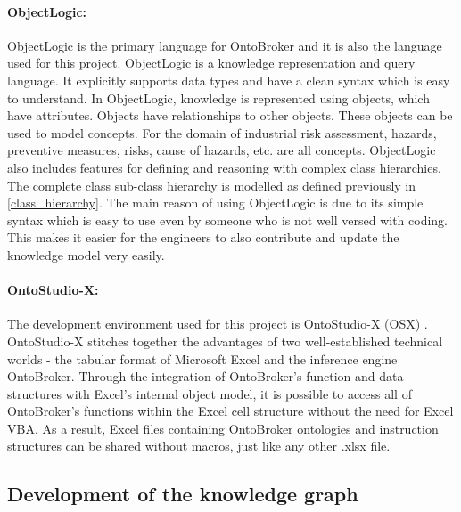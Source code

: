 \paragraph{ObjectLogic: } ObjectLogic is the primary language for OntoBroker and it is also the language used for this project. ObjectLogic \cite{obl} is a knowledge representation and query language. It explicitly supports data types and have a clean syntax which is easy to understand. In ObjectLogic, knowledge is represented using objects, which have attributes. Objects have relationships to other objects. These objects can be used to model concepts. For the domain of industrial risk assessment, hazards, preventive measures, risks, cause of hazards, etc. are all concepts. ObjectLogic also includes features for defining and reasoning with complex class hierarchies. The complete class sub-class hierarchy is modelled as defined previously in \ref{class_hierarchy}. The main reason of using ObjectLogic is due to its simple syntax which is easy to use even by someone who is not well versed with coding. This makes it easier for the engineers to also contribute and update the knowledge model very easily.

\paragraph{OntoStudio-X: } The development environment used for this project is OntoStudio-X (OSX) \cite{osx}. OntoStudio-X stitches together the advantages of two well-established technical worlds - the tabular format of Microsoft Excel and the inference engine OntoBroker. Through the integration of OntoBroker's function and data structures with Excel's internal object model, it is possible to access all of OntoBroker's functions within the Excel cell structure without the need for Excel VBA. As a result, Excel files containing OntoBroker ontologies and instruction structures can be shared without macros, just like any other .xlsx file. 


\subsection{Development of the knowledge graph}


